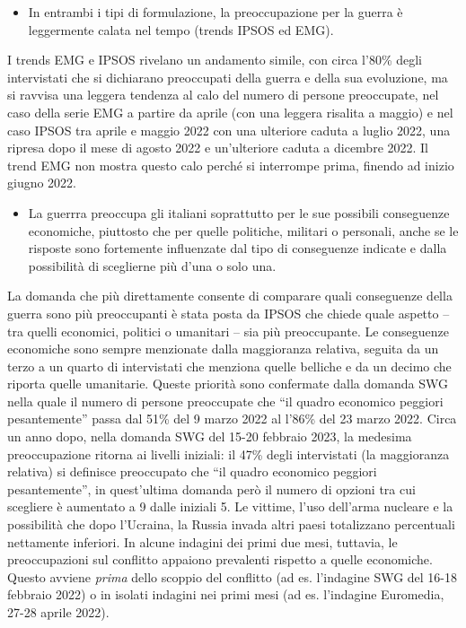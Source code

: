 \documentclass[
]{book}
\providecommand{\tightlist}{%
  \setlength{\itemsep}{0pt}\setlength{\parskip}{0pt}}
\begin{document}
\begin{itemize}
\tightlist
\item
  In entrambi i tipi di formulazione, la preoccupazione per la guerra è leggermente calata nel tempo (trends IPSOS ed EMG).
\end{itemize}

I trends EMG e IPSOS rivelano un andamento simile, con circa l'80\% degli intervistati che si dichiarano preoccupati della guerra e della sua evoluzione, ma si ravvisa una leggera tendenza al calo del numero di persone preoccupate, nel caso della serie EMG a partire da aprile (con una leggera risalita a maggio) e nel caso IPSOS tra aprile e maggio 2022 con una ulteriore caduta a luglio 2022, una ripresa dopo il mese di agosto 2022 e un'ulteriore caduta a dicembre 2022. Il trend EMG non mostra questo calo perché si interrompe prima, finendo ad inizio giugno 2022.

\begin{itemize}
\tightlist
\item
  La guerrra preoccupa gli italiani soprattutto per le sue possibili conseguenze economiche, piuttosto che per quelle politiche, militari o personali, anche se le risposte sono fortemente influenzate dal tipo di conseguenze indicate e dalla possibilità di sceglierne più d'una o solo una.
\end{itemize}

La domanda che più direttamente consente di comparare quali conseguenze della guerra sono più preoccupanti è stata posta da IPSOS che chiede quale aspetto -- tra quelli economici, politici o umanitari -- sia più preoccupante. Le conseguenze economiche sono sempre menzionate dalla maggioranza relativa, seguita da un terzo a un quarto di intervistati che menziona quelle belliche e da un decimo che riporta quelle umanitarie. Queste priorità sono confermate dalla domanda SWG nella quale il numero di persone preoccupate che ``il quadro economico peggiori pesantemente'' passa dal 51\% del 9 marzo 2022 al l'86\% del 23 marzo 2022. Circa un anno dopo, nella domanda SWG del 15-20 febbraio 2023, la medesima preoccupazione ritorna ai livelli iniziali: il 47\% degli intervistati (la maggioranza relativa) si definisce preoccupato che ``il quadro economico peggiori pesantemente'', in quest'ultima domanda però il numero di opzioni tra cui scegliere è aumentato a 9 dalle iniziali 5. Le vittime, l'uso dell'arma nucleare e la possibilità che dopo l'Ucraina, la Russia invada altri paesi totalizzano percentuali nettamente inferiori. In alcune indagini dei primi due mesi, tuttavia, le preoccupazioni sul conflitto appaiono prevalenti rispetto a quelle economiche. Questo avviene \emph{prima} dello scoppio del conflitto (ad es. l'indagine SWG del 16-18 febbraio 2022) o in isolati indagini nei primi mesi (ad es. l'indagine Euromedia, 27-28 aprile 2022).
\end{document}
